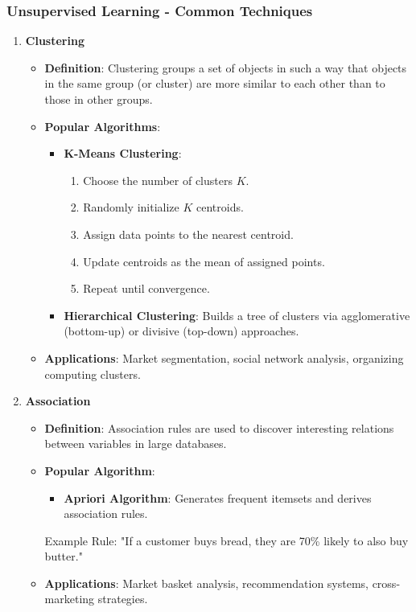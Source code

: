 \documentclass[aspectratio=169]{beamer}
\begin{document}
\begin{frame}[fragile]
  \frametitle{Unsupervised Learning - Common Techniques}
  \begin{enumerate}
    \item \textbf{Clustering}
      \begin{itemize}
        \item \textbf{Definition}: Clustering groups a set of objects in such a way that objects in the same group (or cluster) are more similar to each other than to those in other groups.
        \item \textbf{Popular Algorithms}:
          \begin{itemize}
            \item \textbf{K-Means Clustering}: 
              \begin{enumerate}
                \item Choose the number of clusters \( K \).
                \item Randomly initialize \( K \) centroids.
                \item Assign data points to the nearest centroid.
                \item Update centroids as the mean of assigned points.
                \item Repeat until convergence.
              \end{enumerate}
            \item \textbf{Hierarchical Clustering}: Builds a tree of clusters via agglomerative (bottom-up) or divisive (top-down) approaches.
          \end{itemize}
        \item \textbf{Applications}: Market segmentation, social network analysis, organizing computing clusters.
      \end{itemize}

    \item \textbf{Association}
      \begin{itemize}
        \item \textbf{Definition}: Association rules are used to discover interesting relations between variables in large databases.
        \item \textbf{Popular Algorithm}: 
          \begin{itemize}
            \item \textbf{Apriori Algorithm}: Generates frequent itemsets and derives association rules.
          \end{itemize}
          Example Rule: "If a customer buys bread, they are 70\% likely to also buy butter."
        \item \textbf{Applications}: Market basket analysis, recommendation systems, cross-marketing strategies.
      \end{itemize}
  \end{enumerate}
\end{frame}
\end{document}
